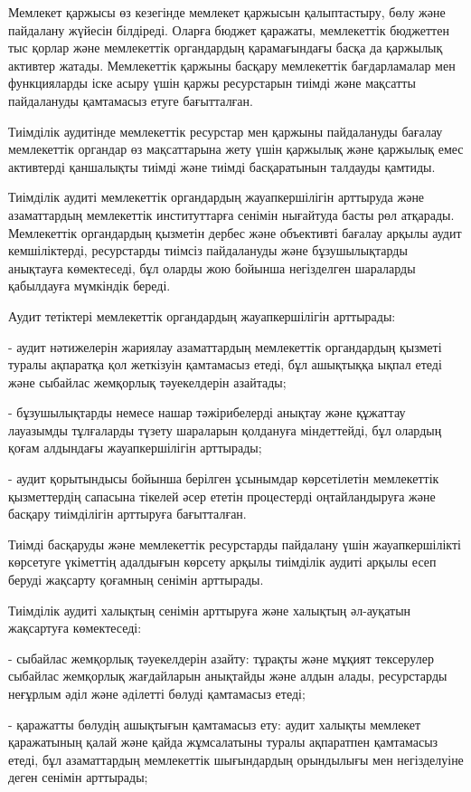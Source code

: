Мемлекет қаржысы өз кезегінде мемлекет қаржысын қалыптастыру, бөлу және
пайдалану жүйесін білдіреді. Оларға бюджет қаражаты, мемлекеттік
бюджеттен тыс қорлар және мемлекеттік органдардың қарамағындағы басқа да
қаржылық активтер жатады. Мемлекеттік қаржыны басқару мемлекеттік
бағдарламалар мен функцияларды іске асыру үшін қаржы ресурстарын тиімді
және мақсатты пайдалануды қамтамасыз етуге бағытталған.

Тиімділік аудитінде мемлекеттік ресурстар мен қаржыны пайдалануды
бағалау мемлекеттік органдар өз мақсаттарына жету үшін қаржылық және
қаржылық емес активтерді қаншалықты тиімді және тиімді басқаратынын
талдауды қамтиды.

Тиімділік аудиті мемлекеттік органдардың жауапкершілігін арттыруда және
азаматтардың мемлекеттік институттарға сенімін нығайтуда басты рөл
атқарады. Мемлекеттік органдардың қызметін дербес және объективті
бағалау арқылы аудит кемшіліктерді, ресурстарды тиімсіз пайдалануды және
бұзушылықтарды анықтауға көмектеседі, бұл оларды жою бойынша негізделген
шараларды қабылдауға мүмкіндік береді.

Аудит тетіктері мемлекеттік органдардың жауапкершілігін арттырады:

- аудит нәтижелерін жариялау азаматтардың мемлекеттік органдардың
қызметі туралы ақпаратқа қол жеткізуін қамтамасыз етеді, бұл ашықтыққа
ықпал етеді және сыбайлас жемқорлық тәуекелдерін азайтады;

- бұзушылықтарды немесе нашар тәжірибелерді анықтау және құжаттау
лауазымды тұлғаларды түзету шараларын қолдануға міндеттейді, бұл олардың
қоғам алдындағы жауапкершілігін арттырады;

- аудит қорытындысы бойынша берілген ұсынымдар көрсетілетін мемлекеттік
қызметтердің сапасына тікелей әсер ететін процестерді оңтайландыруға
және басқару тиімділігін арттыруға бағытталған.

Тиімді басқаруды және мемлекеттік ресурстарды пайдалану үшін
жауапкершілікті көрсетуге үкіметтің адалдығын көрсету арқылы тиімділік
аудиті арқылы есеп беруді жақсарту қоғамның сенімін арттырады.

Тиімділік аудиті халықтың сенімін арттыруға және халықтың әл-ауқатын
жақсартуға көмектеседі:

- сыбайлас жемқорлық тәуекелдерін азайту: тұрақты және мұқият тексерулер
сыбайлас жемқорлық жағдайларын анықтайды және алдын алады, ресурстарды
неғұрлым әділ және әділетті бөлуді қамтамасыз етеді;

- қаражатты бөлудің ашықтығын қамтамасыз ету: аудит халықты мемлекет
қаражатының қалай және қайда жұмсалатыны туралы ақпаратпен қамтамасыз
етеді, бұл азаматтардың мемлекеттік шығындардың орындылығы мен
негізделуіне деген сенімін арттырады;

